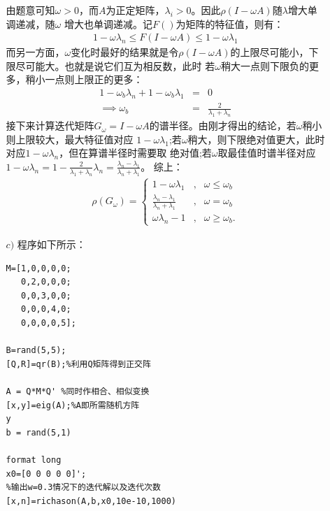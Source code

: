 \documentclass[12pt,a4paper,utf8]{ctexart}
\begin{document}
\begin{enumerate}
\begin{enumerate}
            由题意可知$\omega>0$，而$A$为正定矩阵，$\lambda_{i}>0$。因此$\rho(I-\omega A)$随$\lambda$增大单调递减，随$\omega$
            增大也单调递减。记$F()$为矩阵的特征值，则有：
        \begin{eqnarray} 
            1-\omega \lambda_{n} \leq F(I-\omega A) \leq 1-\omega \lambda_{1}
        \end{eqnarray}
            而另一方面，$\omega$变化时最好的结果就是令$\rho(I-\omega A)$的上限尽可能小，下限尽可能大。也就是说它们互为相反数，此时
            若$\omega$稍大一点则下限负的更多，稍小一点则上限正的更多：
        \begin{eqnarray} 
                1-\omega_{b} \lambda_{n} + 1-\omega_{b} \lambda_{1} &=& 0\\
                \implies \omega_{b} &=& \frac{2}{\lambda_{1}+\lambda_{n}}
        \end{eqnarray}
            接下来计算迭代矩阵$G_{\omega}=I-\omega A$的谱半径。由刚才得出的结论，若$\omega$稍小则上限较大，最大特征值对应
            $1-\omega \lambda_{1}$;若$\omega$稍大，则下限绝对值更大，此时对应$1-\omega \lambda_{n}$，但在算谱半径时需要取
            绝对值;若$\omega$取最佳值时谱半径对应$1-\omega \lambda_{n}=1-\frac{2}{\lambda_{1}+\lambda_{n}} \lambda_{n}=\frac{\lambda_{n}-\lambda_{1}}{\lambda_{n}+\lambda_{1}}$。
            综上：
        \begin{eqnarray} 
            \label{eq6}
            \rho(G_{\omega})=\left\{
            \begin{aligned}
                1-\omega \lambda_{1}                                    & , & \omega \leq \omega_{b} \\
                \frac{\lambda_{n}-\lambda_{1}}{\lambda_{n}+\lambda_{1}} & , & \omega=\omega_{b}\\
                \omega \lambda_{n}-1                                    & , & \omega \geq \omega_{b}.
            \end{aligned}
            \right.
        \end{eqnarray}
    \item[$c)$] 程序如下所示：
        \begin{lstlisting}[frame=single]
%生成正定对称方阵，特征值1，2，3，4，5
M=[1,0,0,0,0;
   0,2,0,0,0;
   0,0,3,0,0;
   0,0,0,4,0;
   0,0,0,0,5];

B=rand(5,5);
[Q,R]=qr(B);%利用Q矩阵得到正交阵

A = Q*M*Q' %同时作相合、相似变换
[x,y]=eig(A);%A即所需随机方阵
y
b = rand(5,1)

format long
x0=[0 0 0 0 0]';
%输出w=0.3情况下的迭代解以及迭代次数
[x,n]=richason(A,b,x0,10e-10,1000)


\end{lstlisting}
\end{enumerate}
\end{enumerate}
\end{document}
